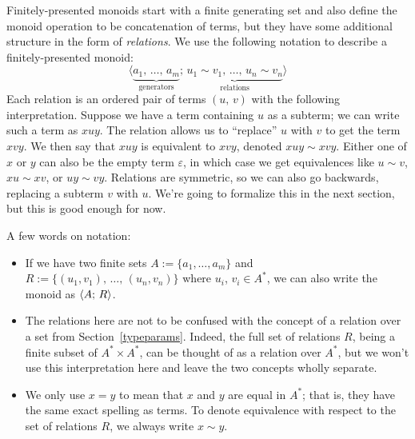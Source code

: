 \documentclass[../generics]{subfiles}
\begin{document}
Finitely-presented monoids start with a finite generating set and also define the monoid operation to be concatenation of terms, but they have some additional structure in the form of \emph{relations}. We use the following notation to describe a finitely-presented monoid:
\[\langle \underbrace{a_1,\,\ldots,\, a_m}_{\text{generators}};\, \underbrace{u_1 \sim v_1,\,\ldots,\, u_n \sim v_n}_{\text{relations}}\rangle\]
Each relation is an ordered pair of terms $(u,\,v)$ with the following interpretation. Suppose we have a term containing $u$ as a subterm; we can write such a term as $xuy$. The relation allows us to ``replace'' $u$ with $v$ to get the term $xvy$. We then say that $xuy$ is equivalent to $xvy$, denoted $xuy\sim xvy$. Either one of $x$ or $y$ can also be the empty term $\varepsilon$, in which case we get equivalences like $u\sim v$, $xu\sim xv$, or $uy\sim vy$. Relations are symmetric, so we can also go backwards, replacing a subterm $v$ with $u$. We're going to formalize this in the next section, but this is good enough for now.

A few words on notation:
\begin{itemize}
\item If we have two finite sets $A := \{a_1,\ldots, a_m\}$ and $R := \{(u_1,v_1),\,\ldots,\,(u_n,v_n)\}$ where $u_i$, $v_i\in A^*$, we can also write the monoid as $\langle A;\,R\rangle$.
\item The relations here are not to be confused with the concept of a relation over a set from Section~\ref{typeparams}. Indeed, the full set of relations $R$, being a finite subset of $A^*\times A^*$, can be thought of as a relation over $A^*$, but we won't use this interpretation here and leave the two concepts wholly separate.
\item We only use $x=y$ to mean that $x$ and $y$ are equal in $A^*$; that is, they have the same exact spelling as terms. To denote equivalence with respect to the set of relations $R$, we always write $x\sim y$.
\end{itemize}
\end{document}
